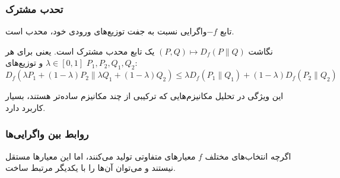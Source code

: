 \subsubsection{تحدب مشترک}
تابع $-f$واگرایی نسبت به جفت توزیع‌های ورودی خود، محدب است.
\begin{قضیه}
نگاشت $(P, Q) \mapsto D_f(P \| Q)$ یک تابع محدب مشترک است. یعنی برای هر $\lambda \in [0, 1]$ و توزیع‌های $P_1, P_2, Q_1, Q_2$:
\begin{equation}
D_f\left(\lambda P_1 + (1-\lambda)P_2 \| \lambda Q_1 + (1-\lambda)Q_2\right) \le \lambda D_f(P_1 \| Q_1) + (1-\lambda) D_f(P_2 \| Q_2)
\end{equation}
\end{قضیه}
این ویژگی در تحلیل مکانیزم‌هایی که ترکیبی از چند مکانیزم ساده‌تر هستند، بسیار کاربرد دارد.
\subsubsection{روابط بین واگرایی‌ها}
اگرچه انتخاب‌های مختلف $f$ معیارهای متفاوتی تولید می‌کنند، اما این معیارها مستقل نیستند و می‌توان آن‌ها را با یکدیگر مرتبط ساخت.
